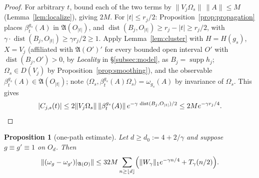 \documentclass[11pt,a4paper]{article}
\theoremstyle{plain}
\newtheorem{proposition}[theorem]{Proposition}
\theoremstyle{definition}
\theoremstyle{plain}
\theoremstyle{definition}
\newcommand{\A}{\mathfrak{A}}
\newcommand{\Om}{\Omega}
\newcommand{\ip}[2]{\langle #1,#2\rangle}
\DeclareMathOperator{\supp}{supp}
\DeclareMathOperator{\dist}{dist}
\begin{document}
\begin{proof}
For arbitrary $t$, bound each of the two terms by
$\|V_j\Om_s\|\,\|A\|\le M$ (Lemma~\ref{lem:localize}), giving $2M$. For $|t|\le r_j/2$:
Proposition~\ref{prop:propagation} places $\beta^{g_s}_t(A)$ in $\A(O_{|t|})$, and
$\dist(B_j,O_{|t|})\ge r_j-|t|\ge r_j/2$, with $\gamma\cdot\dist(B_j,O_{|t|})\ge
\gamma r_j/2\ge1$. Apply Lemma~\ref{lem:cluster} with $H=H(g_s)$, $X=V_j$ (affiliated with
$\A(O')'$ for every bounded open interval $O'$ with $\dist(B_j,O')>0$, by \emph{Locality} in
\S\ref{subsec:model}, as $B_j=\supp h_j$; $\Om_s\in D(V_j)$ by
Proposition~\ref{prop:smoothing}), and the observable $\beta^{g_s}_t(A)\in\A(O_{|t|})$;
note $\ip{\Om_s}{\beta^{g_s}_t(A)\Om_s}=\omega_{g_s}(A)$ by invariance of $\Om_s$. This
gives
\[
 |C_{j,s}(t)|
 \le2\|V_j\Om_s\|\,\|\beta^{g_s}_t(A)\|\,
 e^{-\gamma\,\dist(B_j,O_{|t|})/2}
 \le2Me^{-\gamma r_j/4} .\qedhere
\]
\end{proof}

\begin{proposition}[one-path estimate]\label{prop:onepath}
Let $d\ge d_0:=4+2/\gamma$ and suppose $g\equiv g'\equiv1$ on $O_d$. Then
\begin{equation}
 \|(\omega_g-\omega_{g'})|_{\A(O)}\|
 \le32M\sum_{n\ge\lfloor d\rfloor}
 \Bigl(\|W_\gamma\|_1e^{-\gamma n/4}+T_\gamma(n/2)\Bigr) .
 \label{eq:onepath}
\end{equation}
\end{proposition}
\end{document}
